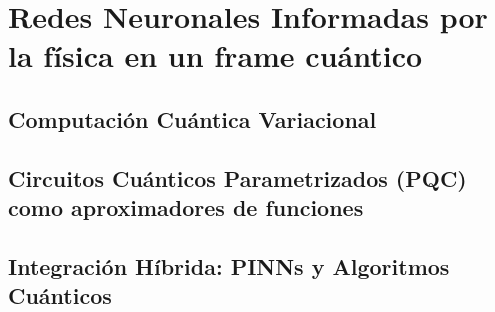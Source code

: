 
\chapter{Redes Neuronales Informadas por la física en un frame cuántico}\label{ch:quantum}
\section{Computación Cuántica Variacional}
\section{Circuitos Cuánticos Parametrizados (PQC) como aproximadores de funciones}
\section{Integración Híbrida: PINNs y Algoritmos Cuánticos}
